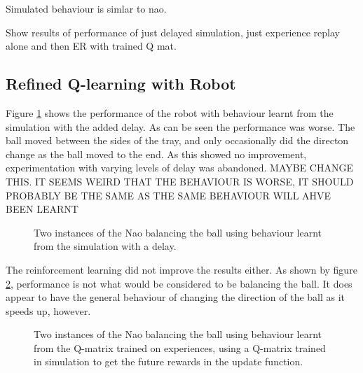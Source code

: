 \documentclass[12pt,a4paper]{article}
\begin{document}




Simulated behaviour is simlar to nao. 

Show results of performance of just delayed simulation, just experience replay alone and then ER with trained Q mat.
\subsection{Refined Q-learning with Robot}
Figure \ref{delay_noer_1} shows the performance of the robot with behaviour learnt from the simulation with the added delay. As can be seen the performance was worse. The ball moved between the sides of the tray, and only occasionally did the directon change as the ball moved to the end. As this showed no improvement, experimentation with varying levels of delay was abandoned. MAYBE CHANGE THIS. IT SEEMS WEIRD THAT THE BEHAVIOUR IS WORSE, IT SHOULD PROBABLY BE THE SAME AS THE SAME BEHAVIOUR WILL AHVE BEEN LEARNT
\begin{figure}[H]
	\centering
	\caption{Two instances of the Nao balancing the ball using behaviour learnt from the simulation with a delay.}
	\label{delay_noer_1}
\end{figure}

The reinforcement learning did not improve the results either. As shown by figure \ref{er_nao}, performance is not what would be considered to be balancing the ball. It does appear to have the general behaviour of changing the direction of the ball as it speeds up, however. 
\begin{figure}[H]
	\centering
    \subfloat[Instance 1]{{\texttt{[image: 36\_er]} }}%
    \subfloat[Instance 2]{{\texttt{[image: 37\_er]} }}%
	\caption{Two instances of the Nao balancing the ball using behaviour learnt from the Q-matrix trained on experiences, using a Q-matrix trained in simulation to get the future rewards in the update function.}
	\label{er_nao}
\end{figure}
\end{document}
